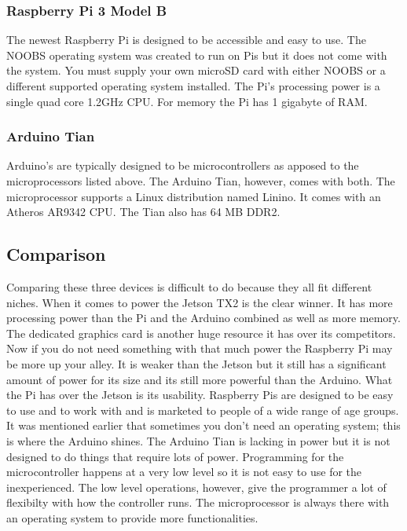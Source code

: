 \documentclass[onecolumn, draftclsnofoot,10pt, compsoc]{IEEEtran}
\begin{document}
		\subsubsection{Raspberry Pi 3 Model B}
			The newest Raspberry Pi is designed to be accessible and easy to use.
			The NOOBS operating system was created to run on Pis but it does not come with the system.
			You must supply your own microSD card with either NOOBS or a different supported operating system installed.
			The Pi's processing power is a single quad core 1.2GHz CPU.
			For memory the Pi has 1 gigabyte of RAM\cite{raspberry_pi}.

		\subsubsection{Arduino Tian}
			Arduino's are typically designed to be microcontrollers as apposed to the microprocessors listed above.
			The Arduino Tian, however, comes with both.
			The microprocessor supports a Linux distribution named Linino.
			It comes with an Atheros AR9342 CPU.
			The Tian also has 64 MB DDR2\cite{arduino_tian}.

	\subsection{Comparison}
		Comparing these three devices is difficult to do because they all fit different niches.
		When it comes to power the Jetson TX2 is the clear winner.
		It has more processing power than the Pi and the Arduino combined as well as more memory.
		The dedicated graphics card is another huge resource it has over its competitors.
		Now if you do not need something with that much power the Raspberry Pi may be more up your alley.
		It is weaker than the Jetson but it still has a significant amount of power for its size and its still more powerful than the Arduino.
		What the Pi has over the Jetson is its usability.
		Raspberry Pis are designed to be easy to use and to work with and is marketed to people of a wide range of age groups.
		It was mentioned earlier that sometimes you don't need an operating system; this is where the Arduino shines.
		The Arduino Tian is lacking in power but it is not designed to do things that require lots of power.
		Programming for the microcontroller happens at a very low level so it is not easy to use for the inexperienced.
		The low level operations, however, give the programmer a lot of flexibilty with how the controller runs.
		The microprocessor is always there with an operating system to provide more functionalities.
\end{document}
